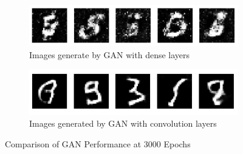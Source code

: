 \begin{figure}[H]
    \centering
    \begin{subfigure}[b]{\linewidth}
        \centering
        \includegraphics[width=0.7\linewidth]{./Images/generate_image_by_dense_layer.jpg}
        \caption{Images generate by GAN with dense layers}
        \label{fig:Dense}
    \end{subfigure}
    \vspace{0.05\linewidth} 
    \begin{subfigure}[b]{\linewidth}
        \centering
        \includegraphics[width=0.7\linewidth]{./Images/generate_image_by_Convolution_layer.jpg}
        \caption{Images generated by GAN with convolution layers}
        \label{fig:Conv2DTranspose}
    \end{subfigure}
    \caption{Comparison of GAN Performance at 3000 Epochs}
    \label{fig:combined}
\end{figure}

